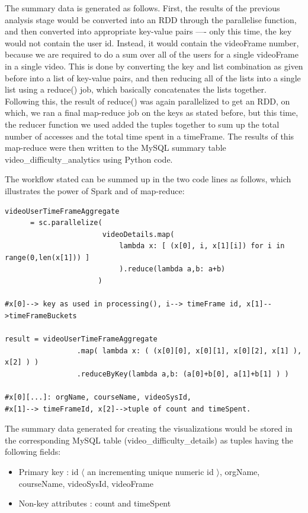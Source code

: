 \documentclass[16pt]{report}
\begin{document}
The summary data is generated as follows. First, the results of the previous analysis stage would be converted into an RDD through the parallelise function, and then converted into appropriate key-value pairs ---- only this time, the key would not contain the user id. Instead, it would contain the videoFrame number, because we are required to do a sum over all of the users for a single videoFrame in a single video. This is done by converting the key and list combination as given before into a list of key-value pairs, and then reducing all of the lists into a single list using a reduce() job, which basically concatenates the lists together.\\

Following this, the result of reduce() was again parallelized to get an RDD, on which, we ran a final map-reduce job on the keys as stated before, but this time, the reducer function we used added the tuples together to sum up the total number of accesses and the total time spent in a timeFrame. The results of this map-reduce were then written to the MySQL summary table video\_difficulty\_analytics using Python code.

The workflow stated can be summed up in the two code lines as follows, which illustrates the power of Spark and of map-reduce:

\begin{verbatim}
videoUserTimeFrameAggregate
      = sc.parallelize(
                       videoDetails.map(
                           lambda x: [ (x[0], i, x[1][i]) for i in range(0,len(x[1])) ]
                           ).reduce(lambda a,b: a+b)
                      )
                      
#x[0]--> key as used in processing(), i--> timeFrame id, x[1]-->timeFrameBuckets

result = videoUserTimeFrameAggregate
                 .map( lambda x: ( (x[0][0], x[0][1], x[0][2], x[1] ), x[2] ) )
                 .reduceByKey(lambda a,b: (a[0]+b[0], a[1]+b[1] ) )
                 
#x[0][...]: orgName, courseName, videoSysId, 
#x[1]--> timeFrameId, x[2]-->tuple of count and timeSpent.
\end{verbatim}


The summary data generated for creating the visualizations would be stored in the corresponding MySQL table (video\_difficulty\_details) as tuples having the following fields:

\begin{itemize}

\item Primary key : id $\langle$ an incrementing unique numeric id $\rangle$, orgName, courseName, videoSysId, videoFrame
\item Non-key attributes : count and timeSpent

\end{itemize}
\end{document}
